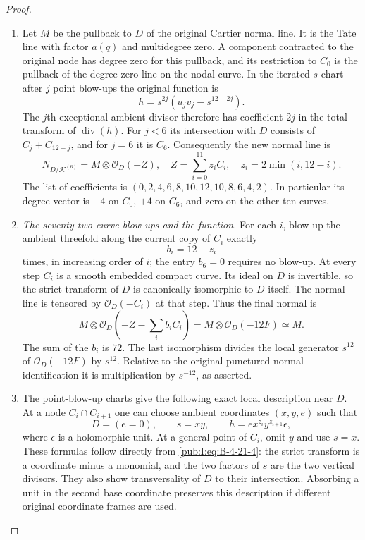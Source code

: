 \begin{proof}
\begin{enumerate}[label=\arabic*.,leftmargin=*]
\item Let $M$ be the pullback to $D$ of the original Cartier normal
line.  It is the Tate line with factor $a(q)$ and multidegree
zero.  A component contracted to the original node has degree
zero for this pullback, and its restriction to $C_0$ is the
pullback of the degree-zero line on the nodal curve.
In the iterated $s$ chart after $j$ point blow-ups the original
function is
\[
 h=s^{2j}(u_jv_j-s^{12-2j}).
\]
The $j$th exceptional ambient divisor therefore has coefficient
$2j$ in the total transform of $\operatorname{div}(h)$.
For $j<6$ its intersection with $D$ consists of
$C_j+C_{12-j}$, and for $j=6$ it is $C_6$.
Consequently the new normal line is
\begin{equation}
 N_{D/\mathcal K^{(6)}}=M\otimes\mathcal O_D(-Z),
 \quad Z=\sum_{i=0}^{11}z_iC_i,
 \quad z_i=2\min(i,12-i).
\label{pub:I:eq:B-4-21-6}
\end{equation}
The list of coefficients is
$(0,2,4,6,8,10,12,10,8,6,4,2)$.
In particular its degree vector is $-4$ on $C_0$, $+4$ on
$C_6$, and zero on the other ten curves.

\item \emph{The seventy-two curve blow-ups and the function.}
For each $i$, blow up the ambient threefold along the current
copy of $C_i$ exactly
\[
 b_i=12-z_i
\]
times, in increasing order of $i$; the entry $b_6=0$ requires
no blow-up.  At every step $C_i$ is a smooth embedded compact
curve.  Its ideal on $D$ is invertible, so the strict transform
of $D$ is canonically isomorphic to $D$ itself.  The normal
line is tensored by $\mathcal O_D(-C_i)$ at that step.
Thus the final normal is
\begin{equation}
 M\otimes\mathcal O_D(-Z-\textstyle\sum_i b_iC_i)
   =M\otimes\mathcal O_D(-12F)\simeq M.
\label{pub:I:eq:B-4-21-7}
\end{equation}
The sum of the $b_i$ is $72$.
The last isomorphism divides the local generator $s^{12}$
of $\mathcal O_D(-12F)$ by $s^{12}$.  Relative to the
original punctured normal identification it is multiplication
by $s^{-12}$, as asserted.

\item The point-blow-up charts give the following exact local
description near $D$.  At a node $C_i\cap C_{i+1}$ one can
choose ambient coordinates $(x,y,e)$ such that
\begin{equation}
 D=(e=0),\qquad s=xy,\qquad
 h=e x^{z_i}y^{z_{i+1}}\epsilon,
\label{pub:I:eq:B-4-21-8}
\end{equation}
where $\epsilon$ is a holomorphic unit.  At a general point
of $C_i$, omit $y$ and use $s=x$.  These formulas follow
directly from \eqref{pub:I:eq:B-4-21-4}: the strict transform is a coordinate
minus a monomial, and the two factors of $s$ are the two
vertical divisors.  They also show transversality of $D$ to
their intersection.  Absorbing a unit in the second base
coordinate preserves this description if different original
coordinate frames are used.


\end{enumerate}
\end{proof}
